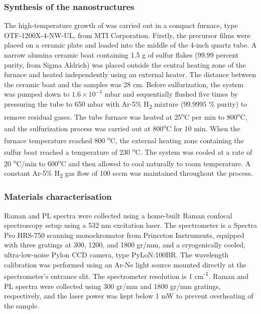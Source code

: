 \documentclass[journal=jacsnano,manuscript=article]{achemso}
\begin{document}
\subsubsection{Synthesis of the  nanostructures}  
The high-temperature growth of  was carried out in a compact furnace, type OTF-1200X-4-NW-UL, from MTI Corporation. Firstly, the precursor films were placed on a ceramic plate and loaded into the middle of the 4-inch quartz tube. A narrow alumina ceramic boat containing 1.5 g of sulfur flakes (99.99 percent purity, from Sigma Aldrich) was placed outside the central heating zone of the furnace and heated independently using an external heater. The distance between the ceramic boat and the samples was 28 cm. Before sulfurization, the system was pumped down to  $1.6\times 10^{-3}$  mbar and sequentially flushed five times by pressuring the tube to 650 mbar with Ar-5\% H\textsubscript{2} mixture ($99.9995$ \% purity) to remove residual gases. The tube furnace was heated at 25\textsuperscript{o}C per min to 800\textsuperscript{o}C, and the sulfurization process was carried out at 800\textsuperscript{o}C for 10 min. When the furnace temperature reached 800 \textsuperscript{o}C, the external heating zone containing the sulfur boat reached a temperature of 230 \textsuperscript{o}C. The system was cooled at a rate of 20 \textsuperscript{o}C/min to 600\textsuperscript{o}C and then allowed to cool naturally to room temperature. A constant Ar-5\% H\textsubscript{2} gas flow of 100 sccm was maintained throughout the process.

\subsubsection{Materials characterisation}
Raman and PL spectra were collected using a home-built Raman confocal spectroscopy setup using a 532 nm excitation laser. The spectrometer is a Spectra Pro HRS-750 scanning monochromator from Princeton Instruments, equipped with three gratings at 300, 1200, and 1800 gr/mm, and a cryogenically cooled, ultra-low-noise Pylon CCD camera, type PyLoN:100BR. The wavelength calibration was performed using an Ar-Ne light source mounted directly at the spectrometer's entrance slit. The spectrometer resolution is 1 cm\textsuperscript{-1}.
 Raman and PL spectra were collected using 300 gr/mm and 1800 gr/mm gratings, respectively, and the laser power was kept below 1 mW to prevent overheating of the sample.
 
\end{document}
